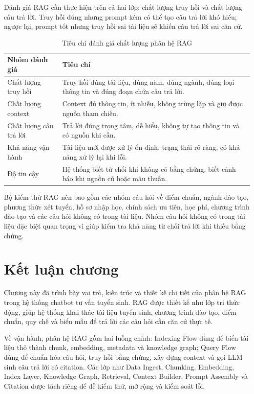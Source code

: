 \documentclass[12pt,a4paper]{report}
\begin{document}
Đánh giá RAG cần thực hiện trên cả hai lớp: chất lượng truy hồi và chất lượng câu trả lời. Truy hồi đúng nhưng prompt kém có thể tạo câu trả lời khó hiểu; ngược lại, prompt tốt nhưng truy hồi sai tài liệu sẽ khiến câu trả lời sai căn cứ.

\begin{table}[H]
\centering
\begin{tabular}{|p{4cm}|p{8.8cm}|}
\hline
\textbf{Nhóm đánh giá} & \textbf{Tiêu chí} \\
\hline
Chất lượng truy hồi & Truy hồi đúng tài liệu, đúng năm, đúng ngành, đúng loại thông tin và đúng đoạn chứa câu trả lời. \\
\hline
Chất lượng context & Context đủ thông tin, ít nhiễu, không trùng lặp và giữ được nguồn tham chiếu. \\
\hline
Chất lượng câu trả lời & Trả lời đúng trọng tâm, dễ hiểu, không tự tạo thông tin và có nguồn khi cần. \\
\hline
Khả năng vận hành & Tài liệu mới được xử lý ổn định, trạng thái rõ ràng, có khả năng xử lý lại khi lỗi. \\
\hline
Độ tin cậy & Hệ thống biết từ chối khi không có bằng chứng, biết cảnh báo khi nguồn cũ hoặc mâu thuẫn. \\
\hline
\end{tabular}
\caption{Tiêu chí đánh giá chất lượng phân hệ RAG}
\label{tab:rag-evaluation-criteria}
\end{table}

Bộ kiểm thử RAG nên bao gồm các nhóm câu hỏi về điểm chuẩn, ngành đào tạo, phương thức xét tuyển, hồ sơ nhập học, chính sách ưu tiên, học phí, chương trình đào tạo và các câu hỏi không có trong tài liệu. Nhóm câu hỏi không có trong tài liệu đặc biệt quan trọng vì giúp kiểm tra khả năng từ chối trả lời khi thiếu bằng chứng.

\section{Kết luận chương}

Chương này đã trình bày vai trò, kiến trúc và thiết kế chi tiết của phân hệ RAG trong hệ thống chatbot tư vấn tuyển sinh. RAG được thiết kế như lớp tri thức động, giúp hệ thống khai thác tài liệu tuyển sinh, chương trình đào tạo, điểm chuẩn, quy chế và biểu mẫu để trả lời các câu hỏi cần căn cứ thực tế.

Về vận hành, phân hệ RAG gồm hai luồng chính: Indexing Flow dùng để biến tài liệu thô thành chunk, embedding, metadata và knowledge graph; Query Flow dùng để chuẩn hóa câu hỏi, truy hồi bằng chứng, xây dựng context và gọi LLM sinh câu trả lời có citation. Các lớp như Data Ingest, Chunking, Embedding, Index Layer, Knowledge Graph, Retrieval, Context Builder, Prompt Assembly và Citation được tách riêng để dễ kiểm thử, mở rộng và kiểm soát lỗi.
\end{document}
